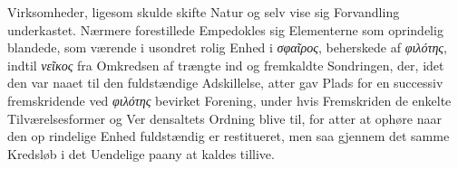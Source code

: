 \documentclass[12pt,a4paper]{book}
\newcommand{\gk}[1]{\textit{#1}}
\begin{document}
%
%
%
%
Virksomheder, ligesom skulde skifte Natur og selv vise sig
Forvandling underkastet. Nærmere forestillede Empedokles sig
Elementerne som oprindelig blandede, som værende i usondret
rolig Enhed i \gk{σφαῖρος}, beherskede af \gk{φιλότης}, indtil \gk{νεῖκος} fra
Omkredsen af trængte ind og fremkaldte Sondringen, der, idet
den var naaet til den fuldstændige Adskillelse, atter gav Plads
for en successiv fremskridende ved \gk{φιλότης} bevirket Forening,
under hvis Fremskriden de enkelte Tilværelsesformer og Ver\-%
densaltets Ordning blive til, for atter at ophøre naar den op\-%
rindelige Enhed fuldstændig er restitueret, men saa gjennem
det samme Kredsløb i det Uendelige paany at kaldes tillive.
\end{document}
